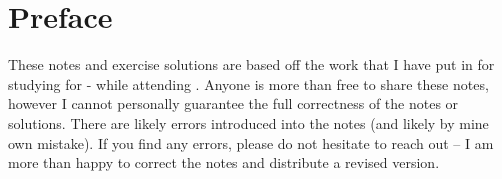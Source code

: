 \documentclass[../main.tex]{subfile}
\begin{document}
\chapter[Preface]{Preface}\label{chap:Preface}

These notes and exercise solutions are based off the work that I have put in for studying for \courseNumber - \courseTitle while attending \courseUni. 
Anyone is more than free to share these notes, however I cannot personally guarantee the full correctness of the notes or solutions. There are likely 
errors introduced into the notes (and likely by mine own mistake). If you find any errors, please do not hesitate to reach out -- I am more than happy 
to correct the notes and distribute a revised version. 
\end{document}
